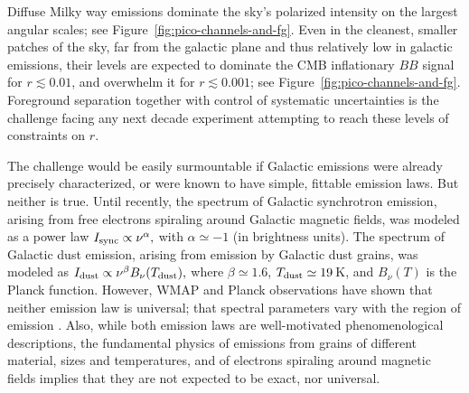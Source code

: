 \documentclass[PICOReport.tex]{subfiles}
\begin{document}

Diffuse Milky way emissions dominate the sky's polarized intensity on the largest angular scales; see Figure~\ref{fig:pico-channels-and-fg}.  Even in the cleanest, smaller patches of the sky, far from the galactic plane and thus relatively low in galactic emissions, their levels are expected to dominate the CMB inflationary $BB$ signal for $r \lesssim 0.01$, and overwhelm it for $r \lesssim0.001$; see Figure~\ref{fig:pico-channels-and-fg}. Foreground separation together with control of systematic uncertainties is the challenge facing any next decade experiment attempting to reach these levels of constraints on $r$.

The challenge would be easily surmountable if Galactic emissions were already precisely characterized, or were  known to have simple, fittable emission laws. But neither is true. Until recently, the spectrum of Galactic synchrotron emission, arising from free electrons spiraling around Galactic magnetic fields, was modeled as a power law $I_{\rm sync} \propto \nu^{\alpha},$ with $\alpha \simeq -1$ (in brightness units). The spectrum of Galactic dust emission, arising from emission by Galactic dust grains, was modeled as $I_{\rm dust} \propto \nu^{\beta} B_\nu(T_{\rm dust}),$ where $\beta \simeq 1.6$, $T_{\rm dust} \simeq 19$\,K, and $B_\nu(T)$ is the Planck function.  However, WMAP and Planck observations have shown that neither emission law is universal; that spectral parameters vary with the region of emission . Also, while both emission laws are well-motivated phenomenological descriptions, the fundamental physics of emissions from grains of different material, sizes and temperatures, and of electrons spiraling around magnetic fields implies that they are not expected to be exact, nor universal. 
\end{document}
